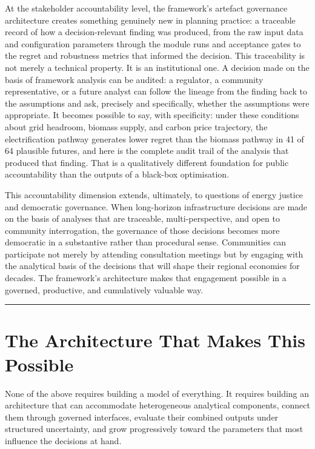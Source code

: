 \documentclass[
  11pt,
  a4paper,
  twoside,
  openright]{scrbook}
\begin{document}
At the stakeholder accountability level, the framework's artefact
governance architecture creates something genuinely new in planning
practice: a traceable record of how a decision-relevant finding was
produced, from the raw input data and configuration parameters through
the module runs and acceptance gates to the regret and robustness
metrics that informed the decision. This traceability is not merely a
technical property. It is an institutional one. A decision made on the
basis of framework analysis can be audited: a regulator, a community
representative, or a future analyst can follow the lineage from the
finding back to the assumptions and ask, precisely and specifically,
whether the assumptions were appropriate. It becomes possible to say,
with specificity: under these conditions about grid headroom, biomass
supply, and carbon price trajectory, the electrification pathway
generates lower regret than the biomass pathway in 41 of 64 plausible
futures, and here is the complete audit trail of the analysis that
produced that finding. That is a qualitatively different foundation for
public accountability than the outputs of a black-box optimisation.

This accountability dimension extends, ultimately, to questions of
energy justice and democratic governance. When long-horizon
infrastructure decisions are made on the basis of analyses that are
traceable, multi-perspective, and open to community interrogation, the
governance of those decisions becomes more democratic in a substantive
rather than procedural sense. Communities can participate not merely by
attending consultation meetings but by engaging with the analytical
basis of the decisions that will shape their regional economies for
decades. The framework's architecture makes that engagement possible in
a governed, productive, and cumulatively valuable way.

\begin{center}\rule{0.5\linewidth}{0.5pt}\end{center}

\section{The Architecture That Makes This
Possible}\label{the-architecture-that-makes-this-possible}

None of the above requires building a model of everything. It requires
building an architecture that can accommodate heterogeneous analytical
components, connect them through governed interfaces, evaluate their
combined outputs under structured uncertainty, and grow progressively
toward the parameters that most influence the decisions at hand.
\end{document}
